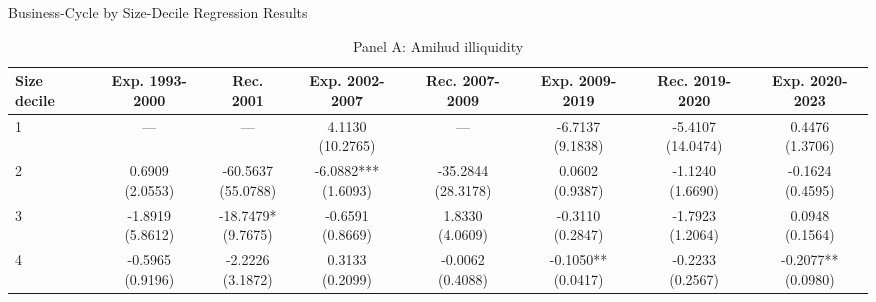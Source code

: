 \begin{table}[!htbp]\centering
\caption{Business-Cycle by Size-Decile Regression Results}
\label{tab:cycle_size_detailed}
\begin{threeparttable}
\footnotesize
\setlength{\tabcolsep}{3.2pt}
\renewcommand{\arraystretch}{1.04}
\begin{subtable}[t]{\textwidth}
\caption{Panel A: Amihud illiquidity}
\centering
\begin{tabular}{@{}lccccccc@{}}
\toprule
Size decile & Exp. 1993-2000 & Rec. 2001 & Exp. 2002-2007 & Rec. 2007-2009 & Exp. 2009-2019 & Rec. 2019-2020 & Exp. 2020-2023 \\
\midrule
1 & — & — & \shortstack{4.1130\\(10.2765)} & — & \shortstack{-6.7137\\(9.1838)} & \shortstack{-5.4107\\(14.0474)} & \shortstack{0.4476\\(1.3706)} \\
2 & \shortstack{0.6909\\(2.0553)} & \shortstack{-60.5637\\(55.0788)} & \shortstack{-6.0882***\\(1.6093)} & \shortstack{-35.2844\\(28.3178)} & \shortstack{0.0602\\(0.9387)} & \shortstack{-1.1240\\(1.6690)} & \shortstack{-0.1624\\(0.4595)} \\
3 & \shortstack{-1.8919\\(5.8612)} & \shortstack{-18.7479*\\(9.7675)} & \shortstack{-0.6591\\(0.8669)} & \shortstack{1.8330\\(4.0609)} & \shortstack{-0.3110\\(0.2847)} & \shortstack{-1.7923\\(1.2064)} & \shortstack{0.0948\\(0.1564)} \\
4 & \shortstack{-0.5965\\(0.9196)} & \shortstack{-2.2226\\(3.1872)} & \shortstack{0.3133\\(0.2099)} & \shortstack{-0.0062\\(0.4088)} & \shortstack{-0.1050**\\(0.0417)} & \shortstack{-0.2233\\(0.2567)} & \shortstack{-0.2077**\\(0.0980)} \\

\end{tabular}
\end{subtable}
\end{threeparttable}
\end{table}
